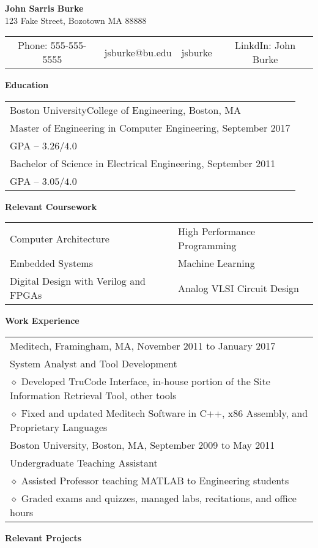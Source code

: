 \documentclass[11pt,letterpaper]{article}
\makeatletter
\newcommand{\pseudoitem}{\diamond}
\newcommand{\vertspace}{\vspace{2mm}}
\newcommand{\horzindent}{\hspace{3mm}}
\newcommand{\minoritem}{\hspace{4.5mm} $\pseudoitem$ }
\newcommand{\name}{John Sarris Burke}
\newcommand{\address}{123 Fake Street, Bozotown MA 88888}
\newcommand{\phone}{555-555-5555}
\newcommand{\email}{jsburke@bu.edu}
\newcommand{\github}{jsburke}
\newcommand{\linkdin}{John Burke}
\newcommand{\undergrad}{Boston University}
\newcommand{\undergradmajor}{Electrical Engineering}
\newcommand{\undergradend}{September 2011}
\newcommand{\grad}{Boston University}
\newcommand{\gradschool}{College of Engineering}
\newcommand{\gradmajor}{Computer Engineering}
\newcommand{\gradend}{September 2017}
\newlength\myheight
\newlength\mydepth
\newcommand*\inlineicon[1]{%
  \settototalheight\myheight{Xygp}%
  \settodepth\mydepth{Xygp}%
  \raisebox{-\mydepth}{\texttt{[image: \#1]}}%
}
\newcommand{\iconemail}{\inlineicon{email-icon-2048}\space}
\newcommand{\icongithub}{\inlineicon{GitHub-Mark-120px-plus}\space}
\newcommand{\iconphone}{Phone: }
\newcommand{\iconlinkdin}{LinkdIn: }
\makeatother
\begin{document}
	
	\begin{center}	
		\textbf{\large \name}\\
		\address\\
		\begin{tabular}{c||c||c||c}
			\iconphone \phone & \iconemail \email & \icongithub \github & \iconlinkdin \linkdin \\
		\end{tabular}
	\end{center}

	\noindent
	\textbf{Education} \\
		\begin{tabular}{l}
			\grad\space\gradschool , Boston, MA \\
			Master of Engineering in \gradmajor , \gradend \\
			GPA -- $3.26 / 4.0$ \\
			Bachelor of Science in \undergradmajor , \undergradend \\
			GPA -- $3.05 / 4.0$ \\
		\end{tabular}
	
	\vertspace
	\noindent	
	\textbf{Relevant Coursework}	 \\
		\begin{tabular}{ll}
			Computer Architecture & High Performance Programming \\
			Embedded Systems      & Machine Learning \\
			Digital Design with Verilog and FPGAs & Analog VLSI Circuit Design \\
		\end{tabular}
		
	\vertspace
	\noindent
	\textbf{Work Experience} \\
		\begin{tabular}{l}
			Meditech, Framingham, MA, November 2011 to January 2017\\
			\horzindent System Analyst and Tool Development \\
			\minoritem Developed TruCode Interface, in-house portion of the Site Information Retrieval Tool, other tools \\
			\minoritem Fixed and updated Meditech Software in C++, x86 Assembly, and Proprietary Languages \\
			\undergrad , Boston, MA, September 2009 to May 2011 \\
			\horzindent Undergraduate Teaching Assistant \\
			\minoritem Assisted Professor teaching MATLAB to Engineering students \\
			\minoritem Graded exams and quizzes, managed labs, recitations, and office hours \\
		\end{tabular}
		
	\vertspace
	\noindent
	\textbf{Relevant Projects}
\end{document}
